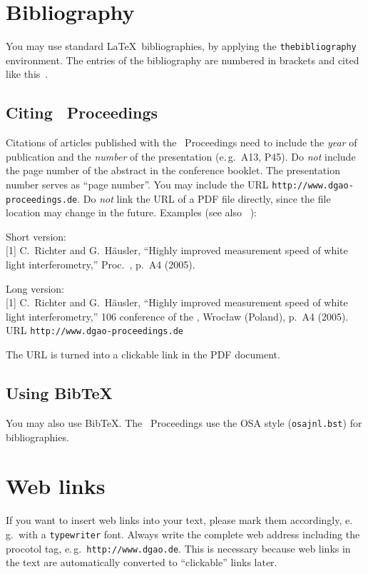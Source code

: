 \documentclass{DGaO-Proc}
\begin{document}
\section{Bibliography}

You may use standard \LaTeX\ bibliographies, by applying the {\tt thebibliography} environment.
The entries of the bibliography are numbered in brackets and cited like this~\cite{Companion04}.

\subsection{Citing \dgao\ Proceedings}

Citations of articles published with the \dgao\ Proceedings need to include the \emph{year} of
publication and the \emph{number} of the presentation (e.\,g.\ A13, P45). Do \emph{not} include the 
page number of the abstract in the conference booklet. The presentation number serves as ``page number''.
You may include the URL \verb|http://www.dgao-proceedings.de|. Do \emph{not} link the URL of a PDF
file directly, since the file location may change in the future. Examples (see also ~\cite{Richter05}):

Short version:\\
{\footnotesize
[1] C.~Richter and G.~H\"ausler, ``Highly improved measurement speed of white light interferometry,''
Proc.\ \dgao, p.\ A4 (2005).
}

Long version:\\
{\footnotesize
[1] C.~Richter and G.~H\"ausler, ``Highly improved measurement speed of white light interferometry,''
106 conference of the \dgao, Wroc{\l}aw (Poland), p.\ A4 (2005). 
URL \texttt{http://www.dgao-proceedings.de}
}

The URL is turned into a clickable link in the PDF document.

\subsection{Using Bib\TeX}

You may also use Bib\TeX. The \dgao\ Proceedings use the OSA style (\texttt{osajnl.bst}) for bibliographies.

\section{Web links}

If you want to insert web links into your text, please mark them accordingly, e.\,g.\ with a
{\tt typewriter} font. Always write the complete web address including the procotol tag,
e.\,g.\ \verb|http://www.dgao.de|. This is necessary because web links in the text are
automatically converted to "`clickable"' links later.
\end{document}
